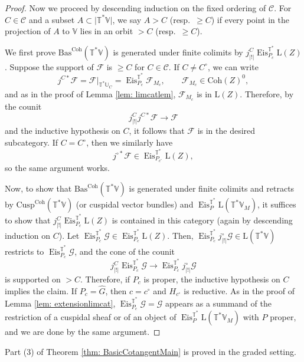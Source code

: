 \documentclass{amsart}
\theoremstyle{definition}
\theoremstyle{remark}
\numberwithin{equation}{section}
\newcommand{\U}{\mathbb{U}}
\newcommand{\mc}{\mathcal}
\newcommand{\wh}{\widehat}
\DeclareMathOperator{\Eis}{\mathrm{Eis}}
\newcommand{\Coh}{\mathrm{Coh}}
\newcommand{\Cusp}{\mathrm{Cusp}}
\newcommand{\V}{\mathbb{V}}
\newcommand{\T}{\mathbb{T}}
\newcommand{\Bas}{\mathrm{Bas}}
\newcommand{\ush}{\lvert ! \rvert}
\newcommand{\mrL}{\mathrm{L}}
\begin{document}
\begin{proof}
Now we proceed by descending induction on the fixed ordering of $\mc C$. For $C\in \mc C$ and a subset $A \subset \lvert \T^* \V\rvert$, we say $A> C$ (resp.~$\geq C$) if every point in the projection of $A$ to $\V$ lies in an orbit $> C$ (resp.~$\geq C$). 

We first prove $\Bas^\Coh (\T^*\V)$ is generated under finite colimits by $j^{C}_{\ush}\Eis_{P_c}^{\T^* }\mrL(Z)$. Suppose the support of $\mc F$ is $\geq C$ for $C\in \mc C$. If $C\neq C^\circ$, we can write
\[
j^{C*}\mc F =\mc F |_{\T^*\U_C} = \Eis_{P_c}^{\T^*} \mc F_{M_c}, \qquad \mc F_{M_c}\in  \Coh(Z)^0, 
\]
and as in the proof of Lemma \ref{lem: limcatlem}, $\mc F_{M_c}$ is in $\mrL (Z)$.
Therefore, by the counit
\[
j^C_{\ush}j^{C*}\mc F \to \mc F
\]
and the inductive hypothesis on $C$, it follows that $\mc F$ is in the desired subcategory. If $C=C^\circ$, then we similarly have
\[
j^{\circ*}\mc F \in \Eis_{P_{c^\circ}}^{\T^*} \mrL(Z), 
\]
so the same argument works. 

Now, to show that $\Bas^\Coh(\T^*\V)$ is generated under finite colimits and retracts by $\Cusp^\Coh(\T^*\V)$ (or cuspidal vector bundles) and 
$\Eis_P^{\T^*} \mrL(\T^*\V_M)$, it suffices to show that $j^C_{\ush}\Eis_{P_c}^{\T^* }\mrL(Z)$ is contained in this category (again by descending induction on $C$). 
Let $\Eis_{P_c}^{\T^*}\mc G \in \Eis_{P_c}^{\T^* }\mrL(Z)$. Then, $\Eis_{P_c}^{\T^*}j_{\ush}^\circ \mc G\in \mrL(\T^*\V)$ restricts to $\Eis_{P_c}^{\T^*}\mc G$, and the cone of the counit
\[
j^C_{\ush}\Eis_{P_c}^{\T^*}\mc G\to 
\Eis_{P_c}^{\T^*}j_{\ush}^\circ \mc G 
\]
is supported on $> C$. Therefore, if $P_c$ is proper, the inductive hypothesis on $C$ implies the claim. If $P_c=\wh G$, then $c=c^\circ$ and $H_{c^\circ}$ is reductive. As in the proof of Lemma \ref{lem: extensionlimcat}, $\Eis_{P_c}^{\T^*}\mc G=\mc G$ appears as a summand of the restriction of a cuspidal sheaf or of an object of $\Eis_P^{\T^{\ast}} \mrL(\T^{\ast}\V_M)$ with $P$ proper, and we are done by the same argument. 
\end{proof}

Part (3) of Theorem \ref{thm: BasicCotangentMain} is proved in the graded setting.
\end{document}

